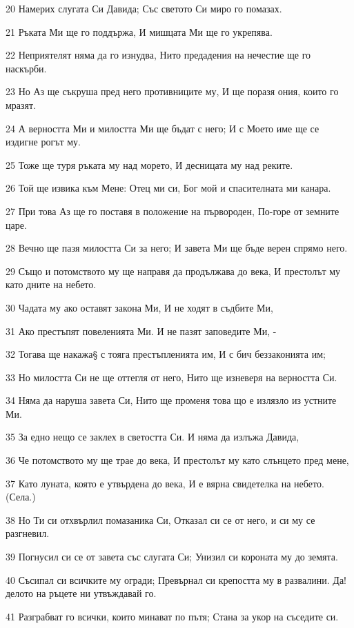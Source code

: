 \par 20 Намерих слугата Си Давида; Със светото Си миро го помазах.
\par 21 Ръката Ми ще го поддържа, И мишцата Ми ще го укрепява.
\par 22 Неприятелят няма да го изнудва, Нито предадения на нечестие ще го наскърби.
\par 23 Но Аз ще съкруша пред него противниците му, И ще поразя ония, които го мразят.
\par 24 А верността Ми и милостта Ми ще бъдат с него; И с Моето име ще се издигне рогът му.
\par 25 Тоже ще туря ръката му над морето, И десницата му над реките.
\par 26 Той ще извика към Мене: Отец ми си, Бог мой и спасителната ми канара.
\par 27 При това Аз ще го поставя в положение на първороден, По-горе от земните царе.
\par 28 Вечно ще пазя милостта Си за него; И завета Ми ще бъде верен спрямо него.
\par 29 Също и потомството му ще направя да продължава до века, И престолът му като дните на небето.
\par 30 Чадата му ако оставят закона Ми, И не ходят в съдбите Ми,
\par 31 Ако престъпят повеленията Ми. И не пазят заповедите Ми, -
\par 32 Тогава ще накажа§ с тояга престъпленията им, И с бич беззаконията им;
\par 33 Но милостта Си не ще оттегля от него, Нито ще изневеря на верността Си.
\par 34 Няма да наруша завета Си, Нито ще променя това що е излязло из устните Ми.
\par 35 За едно нещо се заклех в светостта Си. И няма да излъжа Давида,
\par 36 Че потомството му ще трае до века, И престолът му като слънцето пред мене,
\par 37 Като луната, която е утвърдена до века, И е вярна свидетелка на небето. (Села.)
\par 38 Но Ти си отхвърлил помазаника Си, Отказал си се от него, и си му се разгневил.
\par 39 Погнусил си се от завета със слугата Си; Унизил си короната му до земята.
\par 40 Съсипал си всичките му огради; Превърнал си крепостта му в развалини. Да! делото на ръцете ни утвъждавай го.
\par 41 Разграбват го всички, които минават по пътя; Стана за укор на съседите си.
